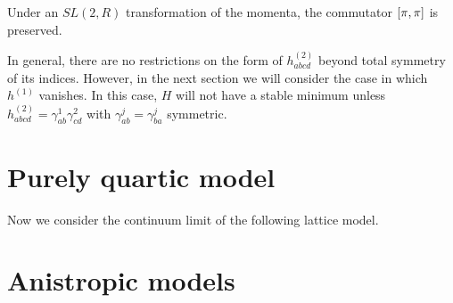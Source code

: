 \documentclass[aps,prb,twocolumn,letterpaper,twoside,nobalancelastpage,groupedaddress,amsmath,amssymb,floatfix,citeautoscript]{revtex4-1}
\begin{document}
Under an $SL(2,R)$ transformation of the momenta, the commutator $\comm{\pi}{\pi}$ is preserved.

In general, there are no restrictions on the form of $h^{(2)}_{abcd}$ beyond total symmetry of its indices. However, in the next section we will consider the case in which $h^{(1)}$ vanishes. In this case, $H$ will not have a stable minimum unless $h^{(2)}_{abcd} = \gamma^1_{ab}\gamma^2_{cd}$ with $\gamma^j_{ab} = \gamma^{j}_{ba}$ symmetric.


\section{Purely quartic model}
Now we consider the continuum limit of the following lattice model.




\section{Anistropic models}

\begin{acknowledgments}

\end{acknowledgments}


\end{document}
